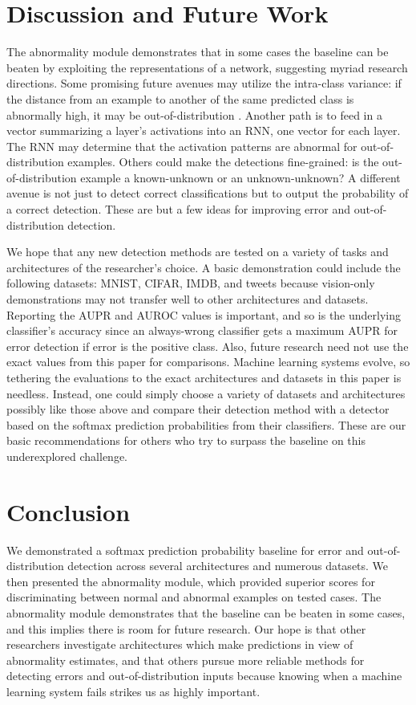 \documentclass{article}
\begin{document}
\section{Discussion and Future Work}
The abnormality module demonstrates that in some cases the baseline can be beaten by exploiting the representations of a network, suggesting myriad research directions. Some promising future avenues may utilize the intra-class variance: if the distance from an example to another of the same predicted class is abnormally high, it may be out-of-distribution \citep{giryes}. Another path is to feed in a vector summarizing a layer's activations into an RNN, one vector for each layer. The RNN may determine that the activation patterns are abnormal for out-of-distribution examples. Others could make the detections fine-grained: is the out-of-distribution example a known-unknown or an unknown-unknown? A different avenue is not just to detect correct classifications but to output the probability of a correct detection. These are but a few ideas for improving error and out-of-distribution detection.

We hope that any new detection methods are tested on a variety of tasks and architectures of the researcher's choice. A basic demonstration could include the following datasets: MNIST, CIFAR, IMDB, and tweets because vision-only demonstrations may not transfer well to other architectures and datasets. Reporting the AUPR and AUROC values is important, and so is the underlying classifier's accuracy since an always-wrong classifier gets a maximum AUPR for error detection if error is the positive class. Also, future research need not use the exact values from this paper for comparisons. Machine learning systems evolve, so tethering the evaluations to the exact architectures and datasets in this paper is needless. Instead, one could simply choose a variety of datasets and architectures possibly like those above and compare their detection method with a detector based on the softmax prediction probabilities from their classifiers. These are our basic recommendations for others who try to surpass the baseline on this underexplored challenge.

\section{Conclusion}
We demonstrated a softmax prediction probability baseline for error and out-of-distribution detection across several architectures and numerous datasets. We then presented the abnormality module, which provided superior scores for discriminating between normal and abnormal examples on tested cases. The abnormality module demonstrates that the baseline can be beaten in some cases, and this implies there is room for future research. Our hope is that other researchers investigate architectures which make predictions in view of abnormality estimates, and that others pursue more reliable methods for detecting errors and out-of-distribution inputs because knowing when a machine learning system fails strikes us as highly important.
\end{document}
